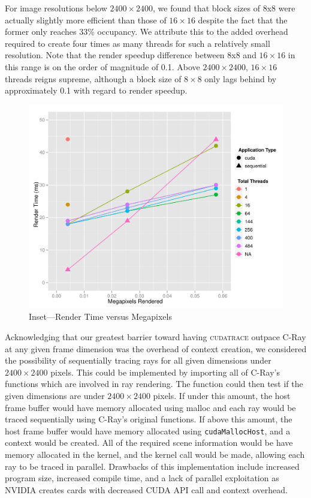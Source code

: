 \documentclass[12pt]{article}
\begin{document}
For image resolutions below $2400 \times 2400$, we found that block sizes of 8x8 were actually slightly more efficient than those of $16 \times 16$ despite the fact that the former only reaches 33\% occupancy. We attribute this to the added overhead required to create four times as many threads for such a relatively small resolution. Note that the render speedup difference between 8x8 and $16 \times 16$ in this range is on the order of magnitude of 0.1. Above $2400 \times 2400$, $16 \times 16$ threads reigns supreme, although a block size of $8 \times 8$ only lags behind by approximately 0.1 with regard to render speedup.

\begin{figure}
    \caption{Inset---Render Time versus Megapixels} \label{fig:render_no_jitter_time_zoom3}
    \begin{center}
\includegraphics{cudatrace-011}
    \end{center}
\end{figure}

Acknowledging that our greatest barrier toward having \textsc{cudatrace} outpace C-Ray at any given frame dimension was the overhead of context creation, we considered the possibility of sequentially tracing rays for all given dimensions under $2400 \times 2400$ pixels. This could be implemented by importing all of C-Ray's functions which are involved in ray rendering. The function could then test if the given dimensions are under $2400 \times 2400$ pixels. If under this amount, the host frame buffer would have memory allocated using malloc and each ray would be traced sequentially using C-Ray's original functions. If above this amount, the host frame buffer would have memory allocated using \texttt{cudaMallocHost}, and a context would be created. All of the required scene information would be have memory allocated in the kernel, and the kernel call would be made, allowing each ray to be traced in parallel. Drawbacks of this implementation include increased program size, increased compile time, and a lack of parallel exploitation as NVIDIA creates cards with decreased CUDA API call and context overhead. 
\end{document}
